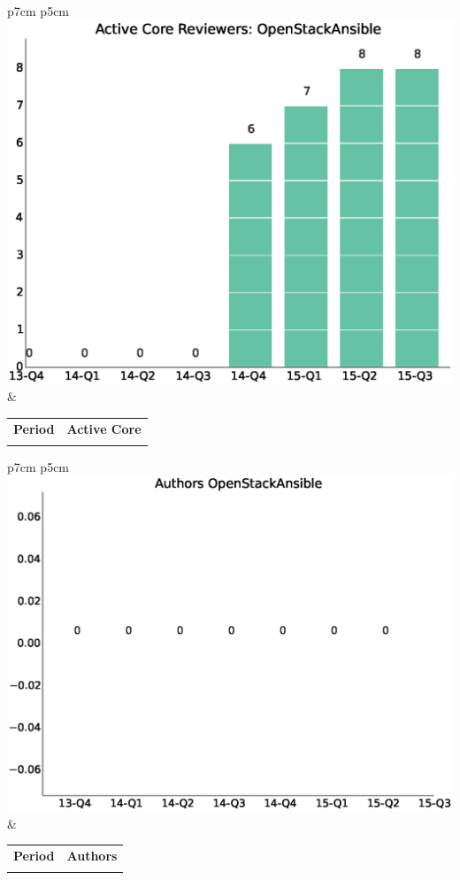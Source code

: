 \documentclass[a4wide,11pt]{article}
\begin{document}
\begin{tabular}{p{7cm} p{5cm}}
    \vspace{0pt} 
    \includegraphics[scale=.35]{figs/active_core_scrOpenStackAnsible.eps}
    & 
    \vspace{0pt}
    \begin{tabular}{l|l}%
    \bfseries Period & \bfseries Active Core %
    \csvreader[head to column names]{data/active_core_scrOpenStackAnsible.csv}{}%
    {\\ & \activecorereviewers}
    \end{tabular}
\end{tabular}

\begin{tabular}{p{7cm} p{5cm}}
    \vspace{0pt} 
    \includegraphics[scale=.35]{figs/authorsOpenStackAnsible.eps}
    & 
    \vspace{0pt}
    \begin{tabular}{l|l}%
    \bfseries Period & \bfseries Authors %
    \csvreader[head to column names]{data/authorsOpenStackAnsible.csv}{}%
    {\\ & \authors}
    \end{tabular}
\end{tabular}
\end{document}
